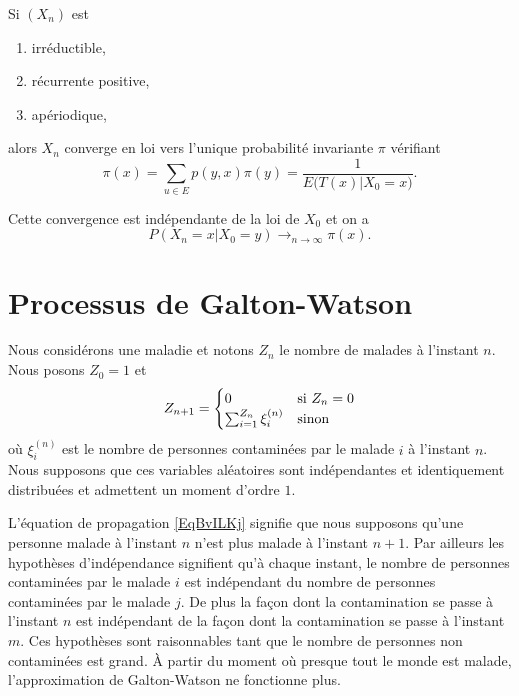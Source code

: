 \begin{theorem}
    Si \( (X_n)\) est
    \begin{enumerate}
        \item
            irréductible,
        \item
            récurrente positive,
        \item
            apériodique,
    \end{enumerate}
    alors \( X_n\) converge en loi vers l'unique probabilité invariante \( \pi\) vérifiant
    \begin{equation}
        \pi(x)=\sum_{u\in E}p(y,x)\pi(y)=\frac{1}{ E\big( T(x)|X_0=x \big) }.
    \end{equation}

    Cette convergence est indépendante de la loi de \( X_0\) et on a
    \begin{equation}
        P(X_n=x|X_0=y)\to_{n\to \infty} \pi(x).
    \end{equation}
\end{theorem}

\section{Processus de Galton-Watson}
\label{SecBPmrPdtGalton}

Nous considérons une maladie et notons \( Z_n\) le nombre de malades à l'instant \( n\). Nous posons \( Z_0=1\) et
\begin{equation}        \label{EqBvILKj}
    Z_{n+1}=\begin{cases}
        0    &   \text{si \( Z_n=0\)}\\
        \sum_{i=1}^{Z_n}\xi_i^{(n)}    &    \text{sinon}
    \end{cases}
\end{equation}
où \( \xi_i^{(n)}\) est le nombre de personnes contaminées par le malade \(i\) à l'instant \( n\). Nous supposons que ces variables aléatoires sont indépendantes et identiquement distribuées et admettent un moment d'ordre \( 1\).

L'équation de propagation \ref{EqBvILKj} signifie que nous supposons qu'une personne malade à l'instant \( n\) n'est plus malade à l'instant \( n+1\). Par ailleurs les hypothèses d'indépendance signifient qu'à chaque instant, le nombre de personnes contaminées par le malade \( i\) est indépendant du nombre de personnes contaminées par le malade \( j\). De plus la façon dont la contamination se passe à l'instant \( n\) est indépendant de la façon dont la contamination se passe à l'instant \( m\). Ces hypothèses sont raisonnables tant que le nombre de personnes non contaminées est grand. À partir du moment où presque tout le monde est malade, l'approximation de Galton-Watson ne fonctionne plus.

